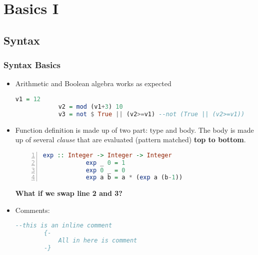 	\section{Basics I}
	\frame{\sectionpage}
	
	\subsection{Syntax}
	
	\begin{frame}[fragile]\frametitle{Syntax Basics}
	\begin{itemize}
	\item Arithmetic and Boolean algebra works as expected
	\begin{lstlisting}[language=Haskell,basicstyle=\footnotesize\ttfamily]
			v1 = 12
			v2 = mod (v1+3) 10 
			v3 = not $ True || (v2>=v1) --not (True || (v2>=v1))
	\end{lstlisting}
	\pause
	\item Function definition is made up of two part: type and body. The body is
	made up of several \emph{clause} that are evaluated (pattern matched)
	\textbf{top to bottom}.
	\begin{lstlisting}[language=Haskell,basicstyle=\footnotesize\ttfamily,
	numbers=left] exp :: Integer -> Integer -> Integer
			exp _ 0 = 1
			exp 0 _ = 0
			exp a b = a * (exp a (b-1)) 
	\end{lstlisting}
	\textbf{What if we swap line 2 and 3?}
	\pause		
	\item Comments:
	 \begin{lstlisting}[language=Haskell,basicstyle=\footnotesize\ttfamily]
		--this is an inline comment
		{-
			All in here is comment
		-}				
	\end{lstlisting}
	\end{itemize}
	\end{frame}
	
	
	
